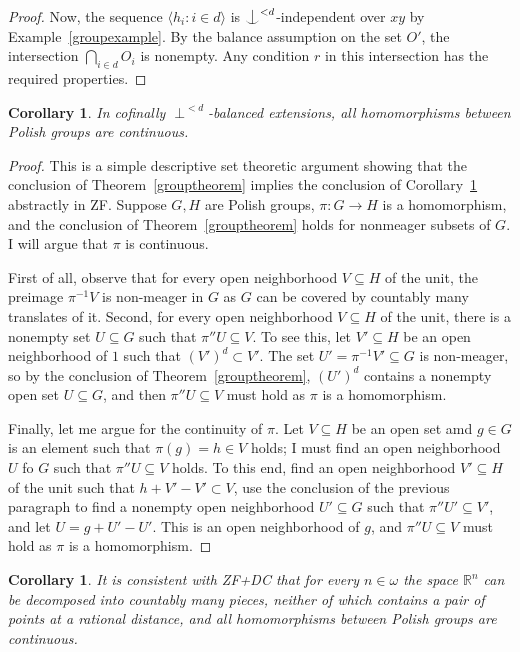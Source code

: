 \documentclass{article}
\newcommand{\gw}{\omega}
\newcommand{\forkindep}[1][]{%
  \mathrel{
    \mathop{
      \vcenter{
        \hbox{\oalign{\noalign{\kern-.3ex}\hfil$\vert$\hfil\cr
              \noalign{\kern-.7ex}
              $\smile$\cr\noalign{\kern-.3ex}}}
      }
    }\displaylimits_{#1}
  }
}
\newtheorem{corollary}[theorem]{Corollary}
\theoremstyle{definition}
\begin{document}
\begin{proof}
\noindent Now, the sequence $\langle h_i\colon i\in d \rangle$ is $\forkindep^{<d}$-independent over $xy$ by Example~\ref{groupexample}. By the balance assumption on the set $O'$, the intersection $\bigcap_{i\in d}O_i$ is nonempty. Any condition $r$ in this intersection has the required properties.
\end{proof}

\begin{corollary}
\label{groupcorollary}
In cofinally $\perp^{<d}$-balanced extensions, all homomorphisms between Polish groups are continuous.
\end{corollary}

\begin{proof}
This is a simple descriptive set theoretic argument showing that the conclusion of Theorem~\ref{grouptheorem} implies the conclusion of Corollary~\ref{groupcorollary} abstractly in ZF.
Suppose $G, H$ are Polish groups, $\pi\colon G\to H$ is a homomorphism, and the conclusion of Theorem~\ref{grouptheorem} holds for nonmeager subsets of $G$. I will argue that $\pi$ is continuous.

First of all, observe that for every open neighborhood $V\subseteq H$ of the unit, the preimage $\pi^{-1}V$ is non-meager in $G$ as $G$ can be covered by countably many translates of it. Second, for every open neighborhood $V\subseteq H$ of the unit, there is a nonempty set $U\subseteq G$ such that $\pi''U\subseteq V$. To see this, let $V'\subseteq H$ be an open neighborhood of $1$ such that $(V')^d\subset V'$. The set $U'=\pi^{-1}V'\subseteq G$ is non-meager, so by the conclusion of Theorem~\ref{grouptheorem}, $(U')^d$ contains a nonempty open set $U\subseteq G$, and then $\pi''U\subseteq V$ must hold as $\pi$ is a homomorphism.

Finally, let me argue for the continuity of $\pi$. Let $V\subseteq H$ be an open set amd $g\in G$ is an element such that $\pi(g)=h\in V$ holds; I must find an open neighborhood $U$ fo $G$ such that $\pi''U\subseteq V$ holds. To this end, find an open neighborhood $V'\subseteq H$ of the unit such that $h+V'-V'\subset V$, use the conclusion of the previous paragraph to find a nonempty open neighborhood $U'\subseteq G$ such that $\pi''U'\subseteq V'$, and let $U=g+U'-U'$. This is an open neighborhood of $g$, and $\pi''U\subseteq V$ must hold as $\pi$ is a homomorphism. 
\end{proof}

\begin{corollary}
It is consistent with ZF+DC that for every $n\in\gw$ the space $\mathbb{R}^n$ can be decomposed into countably many pieces, neither of which contains a pair of points at a rational distance, and all homomorphisms between Polish groups are continuous.
\end{corollary}
\end{document}

